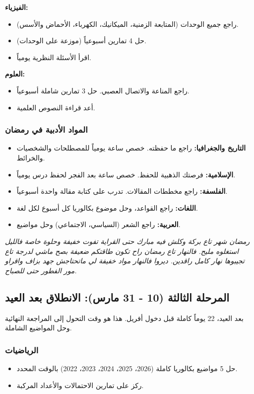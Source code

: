 \documentclass[12pt,a4paper]{book}
\newcommand{\quoteAr}[1]{%
	\begin{myquote}
		\itshape #1
	\end{myquote}
}
\begin{document}
	\textbf{الفيزياء:}
	\begin{itemize}
		\item راجع جميع الوحدات (المتابعة الزمنية، الميكانيك، الكهرباء، الأحماض والأسس).
		\item حل 4 تمارين أسبوعياً (موزعة على الوحدات).
		\item اقرأ الأسئلة النظرية يومياً.
	\end{itemize}
	
	\textbf{العلوم:}
	\begin{itemize}
		\item راجع المناعة والاتصال العصبي. حل 3 تمارين شاملة أسبوعياً.
		\item أعد قراءة النصوص العلمية.
	\end{itemize}
	
	\subsubsection*{المواد الأدبية في رمضان}
	\begin{itemize}
		\item \textbf{التاريخ والجغرافيا:} راجع ما حفظته. خصص ساعة يومياً للمصطلحات والشخصيات والخرائط.
		\item \textbf{الإسلامية:} فرصتك الذهبية للحفظ. خصص ساعة بعد الفجر لحفظ درس يومياً.
		\item \textbf{الفلسفة:} راجع مخططات المقالات. تدرب على كتابة مقالة واحدة أسبوعياً.
		\item \textbf{اللغات:} راجع القواعد، وحل موضوع بكالوريا كل أسبوع لكل لغة.
		\item \textbf{العربية:} راجع الشعر (السياسي، الاجتماعي) وحل مواضيع.
	\end{itemize}
	
	\quoteAr{رمضان شهر تاع بركة وكلش فيه مبارك حتى القراية تفوت خفيفة وحلوة خاصة فالليل استغلوه مليح. فالنهار تاع رمضان راح تكون طاقتكم ضعيفة بصح ماشي لدرجة تاع تجيبوها نهار كامل راقدين. ديروا فالنهار مواد خفيفة لي ماتحتاجش جهد بزاف واقراو مور الفطور حتى للصباح.}
	
	\subsection{المرحلة الثالثة (10 - 31 مارس): الانطلاق بعد العيد}
	بعد العيد، 22 يوماً كاملة قبل دخول أفريل. هذا هو وقت التحول إلى المراجعة النهائية وحل المواضيع الشاملة.
	
	\subsubsection*{الرياضيات}
	\begin{itemize}
		\item حل 5 مواضيع بكالوريا كاملة (2026، 2025، 2024، 2023، 2022) بالوقت المحدد.
		\item ركز على تمارين الاحتمالات والأعداد المركبة.
	\end{itemize}
	
\end{document}
